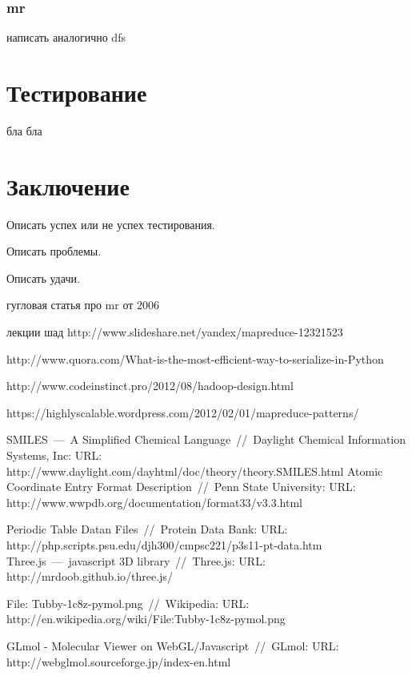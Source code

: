 \documentclass[12pt,a4paper,oneside]{extarticle}
\begin{document}
        \subsubsection{mr}
            написать аналогично dfs
    \clearpage  


\clearpage

\section{Тестирование}
\label{sec:tests}
    бла бла
        
\clearpage

\section{Заключение}

    Описать успех или не успех тестирования. 

    Описать проблемы. 

    Описать удачи.
    
\clearpage


\begin{thebibliography}{0}
    гугловая статья про mr от 2006

    лекции шад http://www.slideshare.net/yandex/mapreduce-12321523

    http://www.quora.com/What-is-the-most-efficient-way-to-serialize-in-Python

    http://www.codeinstinct.pro/2012/08/hadoop-design.html

    https://highlyscalable.wordpress.com/2012/02/01/mapreduce-patterns/

         SMILES~---~A Simplified Chemical Language~//~Daylight Chemical Information Systems, Inc: URL: http://www.daylight.com/dayhtml/doc/theory/theory.SMILES.html
        Atomic Coordinate Entry Format Description~//~Penn State University: URL: http://www.wwpdb.org/documentation/format33/v3.3.html
        
        Periodic Table Datan Files~//~Protein Data Bank: URL: http://php.scripts.psu.edu/djh300/cmpsc221/p3s11-pt-data.htm
        Three.js~---~javascript 3D library~//~Three.js: URL: http://mrdoob.github.io/three.js/
        
       File: Tubby-1c8z-pymol.png~//~Wikipedia: URL: http://en.wikipedia.org/wiki/File:Tubby-1c8z-pymol.png
             
       GLmol - Molecular Viewer on WebGL/Javascript~//~GLmol: URL: http://webglmol.sourceforge.jp/index-en.html
        
\end{thebibliography}
\end{document}
